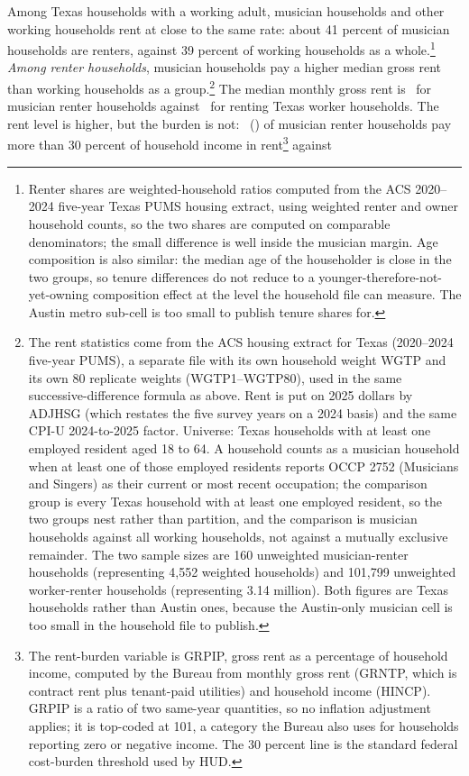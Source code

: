 Among Texas households with a working adult, musician households and other
working households rent at close to the same rate: about 41 percent of
musician households are renters, against 39 percent of working households as
a whole.\footnote{Renter shares are weighted-household ratios computed from
the ACS 2020--2024 five-year Texas PUMS housing extract, using weighted
renter and owner household counts, so the two shares are computed on
comparable denominators; the small difference is well inside the musician
margin. Age composition is also similar: the median age of the householder
is close in the two groups, so tenure differences do not reduce to a
younger-therefore-not-yet-owning composition effect at the level the
household file can measure. The Austin metro sub-cell is too small to
publish tenure shares for.} \emph{Among renter households}, musician
households pay a higher median gross rent than working households as a
group.\footnote{The rent statistics come from the ACS housing extract for
Texas (2020--2024 five-year PUMS), a separate file with its own household
weight WGTP and its own 80 replicate weights (WGTP1--WGTP80), used in the
same successive-difference formula as above. Rent is put on 2025 dollars
by ADJHSG (which restates the five survey years on a 2024 basis) and the
same CPI-U 2024-to-2025 factor. Universe: Texas households with at least
one employed resident aged 18 to 64. A household counts as a musician
household when at least one of those employed residents reports OCCP 2752
(Musicians and Singers) as their current or most recent occupation; the
comparison group is every Texas household with at least one employed
resident, so the two groups nest rather than partition, and the comparison
is musician households against all working households, not against a
mutually exclusive remainder. The two sample sizes are 160 unweighted
musician-renter households (representing 4,552 weighted households) and
101,799 unweighted worker-renter households (representing 3.14 million).
Both figures are Texas households rather than Austin ones, because the
Austin-only musician cell is too small in the household file to publish.}
The median monthly gross rent is \NPumsHhMusMedrent\ for musician renter
households against \NPumsHhWorkerMedrent\ for renting Texas worker
households. The rent level is higher, but the burden is not:
\NPumsHhMusRentThreeZero\ (\NPumsHhMusRentThreeZeroMoe) of musician renter
households pay more than 30 percent of household income in
rent\footnote{The rent-burden variable is GRPIP, gross rent as a percentage
of household income, computed by the Bureau from monthly gross rent (GRNTP,
which is contract rent plus tenant-paid utilities) and household income
(HINCP). GRPIP is a ratio of two same-year quantities, so no inflation
adjustment applies; it is top-coded at 101, a category the Bureau also uses
for households reporting zero or negative income. The 30 percent line is the
standard federal cost-burden threshold used by HUD.} against
